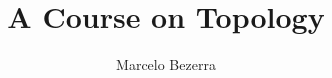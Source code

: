 \documentclass[a4paper,12pt,leqno]{book}
\title{A Course on Topology}
\author{Marcelo Bezerra}
\begin{document}
\frontmatter

\tableofcontents

\mainmatter


\backmatter

\nocite{*}


\end{document}
